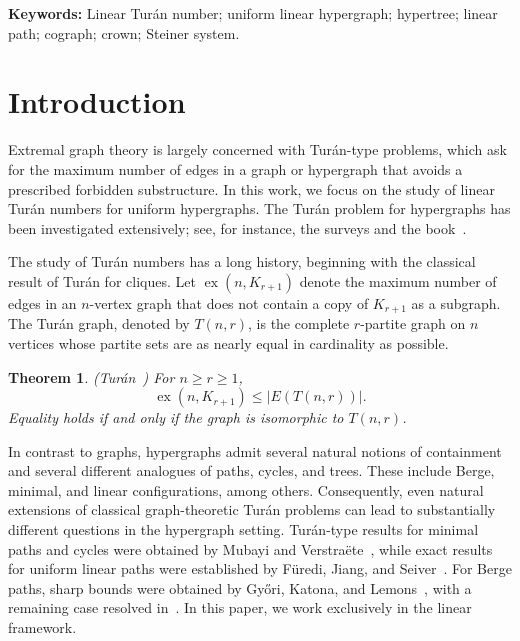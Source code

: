 \documentclass[11pt,a4paper]{article}
\newtheorem{theorem}{Theorem}[section]
\theoremstyle{definition}
\theoremstyle{remark}
\begin{document}
\begin{abstract}
We also give a lower-bound construction leaving a constant-factor gap.

For the linear path \(P_4^r\), we settle the extremal problem in
all uniformities. We prove that every \(n\)-vertex linear
\(r\)-uniform \(P_4^r\)-free hypergraph satisfies
$$
\lvert E(H)\rvert\leq \frac{(r+1)n}{r},
$$
and characterize equality: the extremal hypergraphs are precisely the
disjoint unions of Steiner systems \(S(2,r,r^2)\).
We also exhibit counterexamples to a key structural claim used in a
previously proposed proof of the \(4\)-uniform case.
\end{abstract}


\medskip
\noindent\textbf{Keywords:}
Linear Tur\'an number; uniform linear hypergraph; hypertree; linear path;
cograph; crown; Steiner system.

\section{Introduction}
\label{sec:introduction}

Extremal graph theory is largely concerned with Tur\'an-type problems,
which ask for the maximum number of edges in a graph or hypergraph that
avoids a prescribed forbidden substructure. In this work, we focus on
the study of linear Tur\'an numbers for uniform hypergraphs. The
Tur\'an problem for hypergraphs has been investigated extensively; see,
for instance, the surveys
\cite{furedi1991turan,furedi2013history,keevash2011hypergraph}
and the book~\cite{gerbner2018extremal}.

The study of Tur\'an numbers has a long history, beginning with the
classical result of Tur\'an for cliques. Let
\(\operatorname{ex}(n,K_{r+1})\) denote the maximum number of edges in
an \(n\)-vertex graph that does not contain a copy of \(K_{r+1}\) as a
subgraph. The Tur\'an graph, denoted by \(T(n,r)\), is the complete
\(r\)-partite graph on \(n\) vertices whose partite sets are as nearly
equal in cardinality as possible.

\begin{theorem}\label{th:Turan}
\emph{(Tur\'an~\cite{turan1941egy})}
For \(n\geq r\geq 1\),
$$
\operatorname{ex}(n,K_{r+1})
\leq |E(T(n,r))|.
$$
Equality holds if and only if the graph is isomorphic to
\(T(n,r)\).
\end{theorem}

In contrast to graphs, hypergraphs admit several natural notions of
containment and several different analogues of paths, cycles, and
trees. These include Berge, minimal, and linear configurations, among
others. Consequently, even natural extensions of classical
graph-theoretic Tur\'an problems can lead to substantially different
questions in the hypergraph setting. Tur\'an-type results for minimal
paths and cycles were obtained by Mubayi and
Verstra\"ete~\cite{mubayi2007minimal}, while exact results for uniform
linear paths were established by F\"uredi, Jiang, and
Seiver~\cite{furedi2014exact}. For Berge paths, sharp bounds were
obtained by Gy\H{o}ri, Katona, and
Lemons~\cite{gyHori2016hypergraph}, with a remaining case resolved
in~\cite{davoodi2018erdHos}. In this paper, we work exclusively in the
linear framework.
\end{document}
